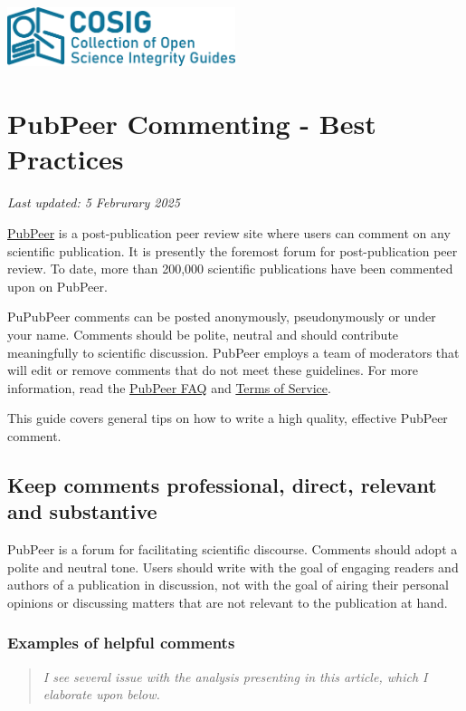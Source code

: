 \documentclass[letterpaper, 12pt]{article}
\begin{document}
\flushleft
\includegraphics[width=0.5\textwidth]{img/home/241017_final_logo_mockup.png}

\section*{PubPeer Commenting - Best Practices}
\textit{Last updated: 5 Februrary 2025}

\href{https://pubpeer.com/}{PubPeer} is a post-publication peer review site where users can comment on any scientific publication. It is presently the foremost forum for post-publication peer review. To date, more than 200,000 scientific publications have been commented upon on PubPeer.

PuPubPeer comments can be posted anonymously, pseudonymously or under your name. Comments should be polite, neutral and should contribute meaningfully to scientific discussion. PubPeer employs a team of moderators that will edit or remove comments that do not meet these guidelines. For more information, read the \href{https://pubpeer.com/static/faq}{PubPeer FAQ} and \href{https://pubpeer.com/static/tos}{Terms of Service}.

This guide covers general tips on how to write a high quality, effective PubPeer comment.

\subsection*{Keep comments professional, direct, relevant and substantive}

PubPeer is a forum for facilitating scientific discourse. Comments should adopt a polite and neutral tone. Users should write with the goal of engaging readers and authors of a publication in discussion, not with the goal of airing their personal opinions or discussing matters that are not relevant to the publication at hand.

\subsubsection*{Examples of helpful comments}

\begin{quote}
    \textit{I see several issue with the analysis presenting in this article, which I elaborate upon below.}
\end{quote}
\end{document}
